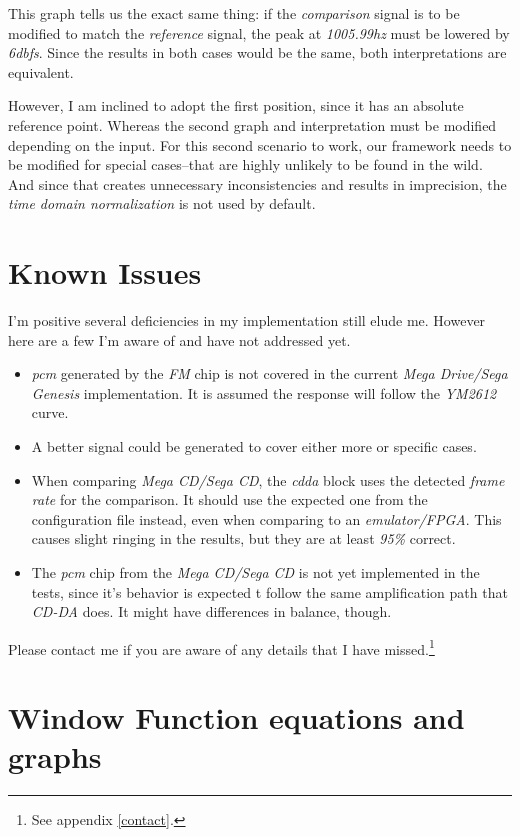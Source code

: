 \documentclass[10pt,a4paper]{report}
\newcommand{\ac}[1]{\textit{\acrshort{#1}}}
\newcommand{\hz}[1]{\textit{#1\acrshort{hz}}}
\newcommand{\db}[1]{\textit{#1\acrshort{dbfs}}}
\begin{document}
\begin{appendices}
This graph tells us the exact same thing: if the \textit{comparison} signal is to be modified to match the \textit{reference} signal, the peak at \hz{1005.99} must be lowered by \db{6}. Since the results in both cases would be the same, both interpretations are equivalent.
	
However, I am inclined to adopt the first position, since it has an absolute reference point. Whereas the second graph and interpretation must be modified depending on the input. For this second scenario to work, our framework needs to be modified for special cases--that are highly unlikely to be found in the wild. And since that creates unnecessary inconsistencies and results in imprecision, the \textit{time domain normalization} is not used by default.

\chapter{Known Issues}

I'm positive several deficiencies in my implementation still elude me. However here are a few I'm aware of and have not addressed yet.

\begin{itemize}
	\item \ac{pcm} generated by the \textit{FM} chip is not covered in the current \textit{Mega Drive/Sega Genesis} implementation. It is assumed the response will follow the \textit{YM2612} curve.
	\item A better signal could  be generated to cover either more or specific cases.
	\item When comparing \textit{Mega CD/Sega CD}, the \textit{\ac{cdda}} block uses the detected \textit{frame rate} for the comparison. It should use the expected one from the configuration file instead, even when comparing to an \textit{emulator/FPGA}. This causes slight ringing in the results, but they are at least \textit{95\%} correct.
	\item The \ac{pcm} chip from the \textit{Mega CD/Sega CD} is not yet implemented in the tests, since it's behavior is expected t follow the same amplification path that \textit{CD-DA} does. It might have differences in balance, though.
\end{itemize}

Please contact me if you are aware of any details that I have missed.\footnote{See appendix \ref{contact}.}

\chapter{Window Function equations and graphs}
\label{windowfunctiondetails}


\end{appendices}
\end{document}
